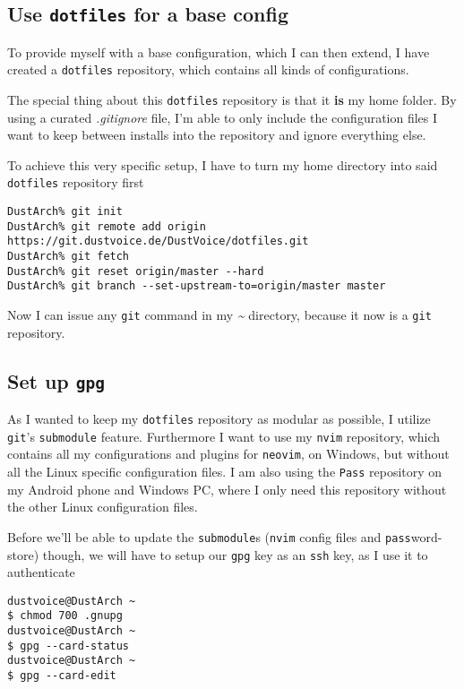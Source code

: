 \documentclass[10pt]{dustdoc}
\begin{document}
\subsection{Use \texttt{dotfiles} for a base config}
\label{sec:use-dotfiles-for-a-base-config}

To provide myself with a base configuration, which I can then extend, I have created a \texttt{dotfiles} repository, which contains all kinds of configurations.

The special thing about this \texttt{dotfiles} repository is that it \textbf{is} my home folder.
By using a curated \textit{.gitignore} file, I’m able to only include the configuration files I want to keep between installs into the repository and ignore everything else.

To achieve this very specific setup, I have to turn my home directory into said \texttt{dotfiles} repository first

\begin{verbatim}
DustArch% git init
DustArch% git remote add origin https://git.dustvoice.de/DustVoice/dotfiles.git
DustArch% git fetch
DustArch% git reset origin/master --hard
DustArch% git branch --set-upstream-to=origin/master master
\end{verbatim}

Now I can issue any \texttt{git} command in my \textit{\~{}} directory, because it now is a \texttt{git} repository.

\subsection{Set up \texttt{gpg}}
\label{sec:set-up-gpg}

As I wanted to keep my \texttt{dotfiles} repository as modular as possible, I utilize \texttt{git}'s \texttt{submodule} feature.
Furthermore I want to use my \texttt{nvim} repository, which contains all my configurations and plugins for \texttt{neovim}, on Windows, but without all the Linux specific configuration files.
I am also using the \texttt{Pass} repository on my Android phone and Windows PC, where I only need this repository without the other Linux configuration files.

Before we’ll be able to update the \texttt{submodule}s (\texttt{nvim} config files and \texttt{pass}word-store) though, we will have to setup our \texttt{gpg} key as an \texttt{ssh} key, as I use it to authenticate

\begin{verbatim}
dustvoice@DustArch ~
$ chmod 700 .gnupg
dustvoice@DustArch ~
$ gpg --card-status
dustvoice@DustArch ~
$ gpg --card-edit
\end{verbatim}
\end{document}

